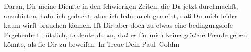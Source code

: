 \pstart
           Daran, Dir meine Dienſte in den ſchwierigen Zeiten, die Du jetzt durchmachſt,
               anzubieten, habe ich \strikeout{\textcolor{gray}{×}} gedacht, aber ich habe  auch gemeint, daß
               Du mich leider kaum wirſt brauchen können. Iſt Dir aber doch zu etwas eine
               bedingungsloſe Ergebenheit nützlich, ſo denke daran, daß es für mich keine größere
               Freude geben könnte, als ſie Dir zu beweiſen.\pend
           \pstart In Treue Dein \spacefill\mbox{Paul Goldm}\pend{}\endnumbering{}  
      